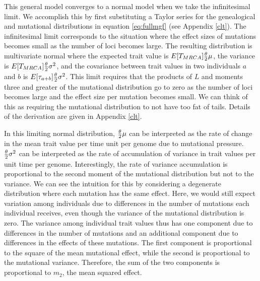 This general model converges to a normal model when we take the infinitesimal
limit. We accomplish this by first substituting a Taylor series for the
genealogical and mutational distributions in equation \eqref{eq:fullmgf} (see
Appendix \ref{clt}). The infinitesimal limit corresponds to the situation where
the effect sizes of mutations becomes small as the number of loci becomes large.
The resulting distribution is multivariate normal where the expected trait value
is $E[T_{MRCA}] \frac{\theta}{2} \mu$, the variance is $E[T_{MRCA}] \frac{\theta}{2} \sigma^2$, and the
covariance between trait values in two individuals $a$ and $b$ is
$E[\tau_{a+b}] \frac{\theta}{2} \sigma^2$. This limit requires that the products of $L$ and
moments three and greater of the mutational distribution go to zero as the
number of loci becomes large and the effect size per mutation becomes small. We
can think of this as requiring the mutational distribution to not have too fat
of tails. Details of the derivation are given in Appendix \ref{clt}.

In this limiting normal distribution, $\frac{\theta}{2} \mu$ can be interpreted as the rate of
change in the mean trait value per time unit per genome due to mutational
pressure. $\frac{\theta}{2} \sigma^2$ can be interpreted as the rate of accumulation of
variance in trait values per unit time per genome. Interestingly, the rate of
variance accumulation is proportional to the second moment of the mutational
distribution but not to the variance. We can see the intuition for this by
considering a degenerate distribution where each mutation has the same effect.
Here, we would still expect variation among individuals due to differences in
the number of mutations each individual receives, even though the variance of
the mutational distribution is zero. The variance among individual trait values
thus has one component due to differences in the number of mutations and an
additional component due to differences in the effects of these mutations. The
first component is proportional to the square of the mean mutational effect,
while the second is proportional to the mutational variance. Therefore, the sum
of the two components is proportional to $m_2$, the mean squared effect.

